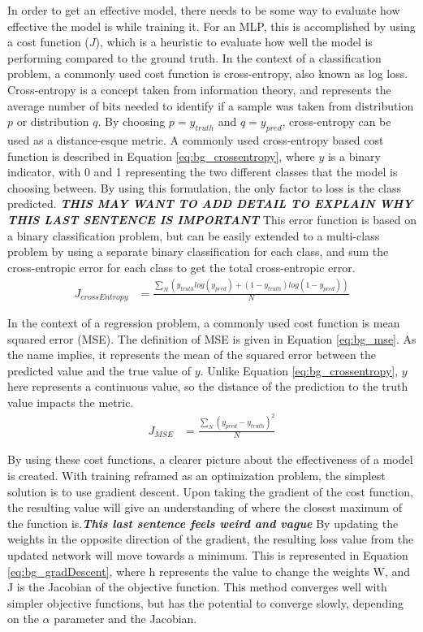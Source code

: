 \documentclass[11pt]{report}
\begin{document}
	\par In order to get an effective model, there needs to be some way to evaluate how effective the model is while training it. For an MLP, this is accomplished by using a cost function ($J$), which is a heuristic to evaluate how well the model is performing compared to the ground truth. In the context of a classification problem, a commonly used cost function is cross-entropy, also known as log loss. Cross-entropy is a concept taken from information theory, and represents the average number of bits needed to identify if a sample was taken from distribution $p$ or distribution $q$. By choosing $p=y_{truth}$ and $q=y_{pred}$, cross-entropy can be used as a distance-esque metric. A commonly used cross-entropy based cost function is described in Equation \ref{eq:bg_crossentropy}, where $y$ is a binary indicator, with 0 and 1 representing the two different classes that the model is choosing between. By using this formulation, the only factor to loss is the class predicted. \textbf{\textit{THIS MAY WANT TO ADD DETAIL TO EXPLAIN WHY THIS LAST SENTENCE IS IMPORTANT}} This error function is based on a binary classification problem, but can be easily extended to a multi-class problem by using a separate binary classification for each class, and sum the cross-entropic error for each class to get the total cross-entropic error.  
	\begin{align}
		J_{crossEntropy} &= \frac{\sum_N (y_{truth}log(y_{pred}) + (1-y_{truth})log(1-y_{pred})) }{N} \label{eq:bg_crossentropy}
	\end{align}
	\par In the context of a regression problem, a commonly used cost function is mean squared error (MSE). The definition of MSE is given in Equation \ref{eq:bg_mse}. As the name implies, it represents the mean of the squared error between the predicted value and the true value of $y$. Unlike Equation \ref{eq:bg_crossentropy}, $y$ here represents a continuous value, so the distance of the prediction to the truth value impacts the metric. 
	\begin{align}
		J_{MSE} &= \frac{\sum_N (y_{pred}-y_{truth})^2}{N} \label{eq:bg_mse}
	\end{align}
	\par By using these cost functions, a clearer picture about the effectiveness of a model is created. With training reframed as an optimization problem, the simplest solution is to use gradient descent. Upon taking the gradient of the cost function, the resulting value will give an understanding of where the closest maximum of the function is.\textbf{\textit{This last sentence feels weird and vague}} By updating the weights in the opposite direction of the gradient, the resulting loss value from the updated network will move towards a minimum. This is represented in Equation \ref{eq:bg_gradDescent}, where h represents the value to change the weights W, and J is the Jacobian of the objective function. This method converges well with simpler objective functions, but has the potential to converge slowly, depending on the $\alpha$ parameter and the Jacobian.
\end{document}
